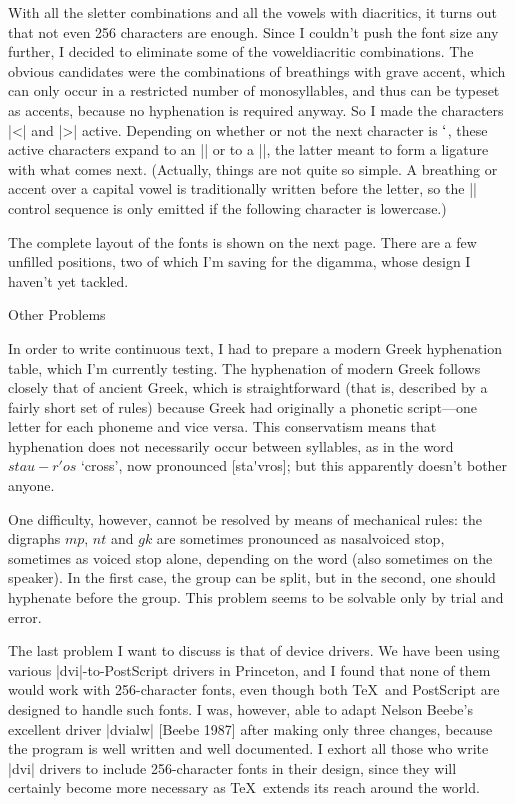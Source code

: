With all the s\plus letter combinations and all the vowels with
diacritics, it turns out that not even 256 characters are enough.
Since I couldn't push the font size any further, I decided to
eliminate some of the vowel\plus diacritic combinations.  The obvious
candidates were the combinations of breathings with grave accent,
which can only occur in a restricted number of monosyllables, and
thus can be typeset as accents, because no hyphenation is required
anyway.  So I made the characters |<| and |>| active.  Depending on
whether or not the next character is $`$, these active characters
expand to an |\accent| or to a |\char|, the latter meant to form
a ligature with what comes next.  (Actually, things are not quite
so simple.  A breathing or accent over a capital vowel is
traditionally written before the letter, so the |\accent| control
sequence is only emitted if the following character is lowercase.)

The complete layout of the fonts is shown on the next page.  There
are a few unfilled positions, two of which I'm saving for the digamma,
whose design I haven't yet tackled.

\heading Other Problems \endheading

In order to write continuous text, I had to prepare a modern Greek
hyphenation table, which I'm currently testing. 
The hyphenation of modern Greek follows closely that of ancient Greek,
which is straightforward (that is, described by a fairly short set of
rules) because Greek had originally a phonetic script---one letter
for each phoneme and vice versa.  This conservatism means that
hyphenation does not necessarily occur between syllables, as in
the word $stau-r'os$ `cross', now pronounced
[sta\'{}vros]; but this apparently doesn't bother anyone.

One difficulty, however, cannot be resolved by means of mechanical
rules: the digraphs $mp$, $nt$ and $gk$ are sometimes pronounced as
nasal\plus voiced stop, sometimes as voiced stop alone, depending on
the word (also sometimes on the speaker).  In the first case, the group
can be split, but in the second, one should hyphenate before the group.
This problem seems to be solvable only by trial and error.

The last problem I want to discuss is that of device drivers.
We have been using various |dvi|-to-PostScript drivers in Princeton,
and I found that none of them would work with
256-character fonts, even though both \TeX\ and PostScript are
designed to handle such fonts.  I was, however, able to adapt Nelson
Beebe's excellent driver |dvialw| [Beebe 1987] after making only
three changes, because the program is well written and well documented.
I exhort all those who write |dvi| drivers to include 256-character
fonts in their design, since they will certainly become more necessary
as \TeX\ extends its reach around the world.

